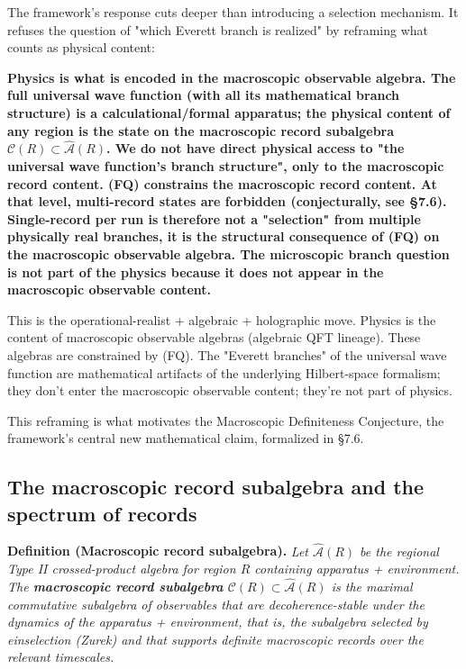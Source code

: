 \documentclass[11pt,a4paper]{article}
\newenvironment{qiqtquote}{\begin{mdframed}[style=quotestyle]}{\end{mdframed}}
\begin{document}
The framework's response cuts deeper than introducing a selection mechanism. It refuses the question of "which Everett branch is realized" by reframing what counts as physical content:

\begin{qiqtquote}
\textbf{Physics is what is encoded in the macroscopic observable algebra. The full universal wave function (with all its mathematical branch structure) is a calculational/formal apparatus; the physical content of any region is the state on the macroscopic record subalgebra $\mathcal{C}(R) \subset \hat{\mathcal{A}}(R)$. We do not have direct physical access to "the universal wave function's branch structure", only to the macroscopic record content. (FQ) constrains the macroscopic record content. At that level, multi-record states are forbidden (conjecturally, see §7.6). Single-record per run is therefore not a "selection" from multiple physically real branches, it is the structural consequence of (FQ) on the macroscopic observable algebra. The microscopic branch question is not part of the physics because it does not appear in the macroscopic observable content.}
\end{qiqtquote}

This is the operational-realist + algebraic + holographic move. Physics is the content of macroscopic observable algebras (algebraic QFT lineage). These algebras are constrained by (FQ). The "Everett branches" of the universal wave function are mathematical artifacts of the underlying Hilbert-space formalism; they don't enter the macroscopic observable content; they're not part of physics.

This reframing is what motivates the Macroscopic Definiteness Conjecture, the framework's central new mathematical claim, formalized in §7.6.

\subsection{The macroscopic record subalgebra and the spectrum of records}

\textbf{Definition (Macroscopic record subalgebra).} \emph{Let $\hat{\mathcal{A}}(R)$ be the regional Type II crossed-product algebra for region $R$ containing apparatus + environment. The \textbf{macroscopic record subalgebra} $\mathcal{C}(R) \subset \hat{\mathcal{A}}(R)$ is the maximal commutative subalgebra of observables that are decoherence-stable under the dynamics of the apparatus + environment, that is, the subalgebra selected by einselection (Zurek) and that supports definite macroscopic records over the relevant timescales.}
\end{document}
